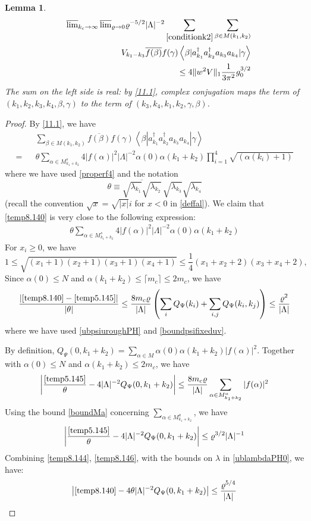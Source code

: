 \documentclass[11pt]{article}
\numberwithin{equation}{section}
\newcommand{\beq}{\begin{equation}}
\newcommand{\eeq}{\end{equation}}
\newcommand{\beqa}{\begin{eqnarray}}
\newcommand{\eeqa}{\end{eqnarray}}
\newcommand\al{{\alpha}}
\newcommand\be{\beta}
\renewcommand\rho\varrho
\newtheorem{lem}{Lemma}[section]
\theoremstyle{definition}
\begin{document}
\begin{lem}\label{101}
\beqa\nonumber
&&\overline\lim_{k_c\to\infty}\,\overline\lim_{\rho\to0}    \rho^{-5/2}|\Lambda|^{-2}  \sum_{\eqref{conditionk2}}\sum_{\be\in M(k_1,k_2)}\\\nonumber
&&\qquad\qquad V_{k_1-k_3}\overline{f(\be)}f(\gamma)\left\langle\be| a^\dagger_{k_1}a^\dagger_{k_2}a_{k_3}a_{k_4}|\gamma\right\rangle
\\\label{resultinMk1k2}
&&\leq 4 \|w^2V\|_1 \frac{1}{3\pi^2}g_0^{3/2}
\eeqa
The sum on the left side is real: by \eqref{11.1}, complex conjugation maps the term of $(k_1,k_2,k_3,k_4,\be,\gamma)$ to the term of $(k_3,k_4,k_1,k_2,\gamma,\be)$. 
\end{lem}
\begin{proof}
By  \eqref{11.1}, we have 
\beqa\label{temp8.140}
&&\sum_{\be\in M(k_1,k_2)}\overline{f(\be)}f(\gamma)\left\langle\be| a^\dagger_{k_1}a^\dagger_{k_2}a_{k_3}a_{k_4}|\gamma\right\rangle\\\nonumber
=&&\theta\sum_{\al\in M^s_{k_1+k_2}}4|f(\al)|^2|\Lambda|^{-2}\al(0)\al(k_1+k_2)\prod_{i=1}^4\sqrt{(\al(k_i)+1)}
\eeqa
where we have used \eqref{properf4} and the notation
\[
\theta\equiv\overline{\sqrt{\lambda_{k_1}}\sqrt{\lambda_{k_2}}}\,\sqrt{\lambda_{k_3}}\sqrt{\lambda_{k_4}} 
\]
(recall the convention $\sqrt{x}=\sqrt{|x|}i$ for $x<0$ in \eqref{deffal}). We claim that \eqref{temp8.140} is very close to the following expression:
\beqa\label{temp5.145}
\theta\sum_{\al\in  M^s_{k_1+k_2} }4|f(\al)|^2|\Lambda|^{-2}\al(0)\al(k_1+k_2)
\eeqa 
For $x_i\geq 0$, we have  
\beq\label{inequalityx1234}
1\leq \sqrt{(x_1+1)(x_2+1)(x_3+1)(x_4+1)}\leq \frac{1}{4}(x_1+x_2+2)(x_3+x_4+2), 
\eeq 
Since $\al(0)\leq N$ and $\al(k_1+k_2)\leq \lceil m_c\rceil\leq 2m_c$, we have 
\beq\label{temp8.144}
\frac{\left|\eqref{temp8.140}-\eqref{temp5.145}\right|}{\left|\theta\right|}\leq \frac{8m_c\rho}{|\Lambda|}\left(\sum_{i}Q_\Psi(k_i)+\sum_{i,j}Q_\Psi(k_i, k_j)\right)
\le \frac{\rho^2}{|\Lambda|}
\eeq
where we have used \eqref{ubpsiuroughPH} and  \eqref{boundpsifixeduv}.

By definition, $Q_\Psi(0,k_1+k_2)=\sum_{\al\in M}\al(0)\al(k_1+k_2)|f(\al)|^2$. Together  with  $\al(0)\leq N$ and $\al(k_1+k_2)\leq 2m_c$, we have 
\beq
\left|\frac{\eqref{temp5.145}}{\theta}-4|\Lambda|^{-2}Q_\Psi(0,k_1+k_2)\right|\leq\frac{8m_c\rho}{|\Lambda|}\sum_{\al\in M^a_{k_1+k_2}}|f(\al)|^2
\eeq
Using the bound \eqref{boundMa} concerning $\sum_{\al\in M^a_{k_1+k_2}}$, we have 
\beq\label{temp8.146}
\left|\frac{\eqref{temp5.145}}{\theta}-4|\Lambda|^{-2}Q_\Psi(0,k_1+k_2)\right|\leq\rho^{3/2}|\Lambda|^{-1}
\eeq
Combining \eqref{temp8.144},  \eqref{temp8.146}, with the bounds on $\lambda$ in \eqref{ublambdaPH0}, we have:
\beq\label{temp8.147}
\left|\eqref{temp8.140}-4\theta|\Lambda|^{-2}Q_\Psi(0,k_1+k_2)\right|\leq \frac{\rho^{5/4}}{|\Lambda|}
\eeq


\end{proof}
\end{document}
